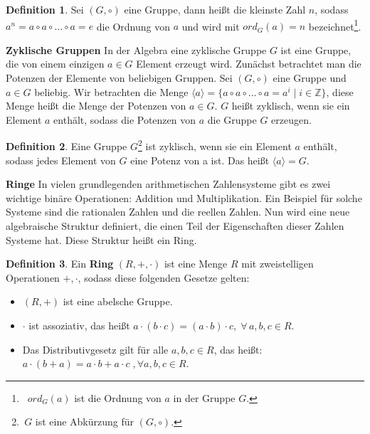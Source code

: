 \documentclass[12pt,oneside]{article}
\theoremstyle{remark}
\theoremstyle{definition}
\newtheorem{definition}{Definition}[section]
\begin{document}
\begin{definition}
Sei $(G,\circ)$ eine Gruppe, dann heißt die kleinste Zahl $n$, sodass $a^n = a \circ a \circ \dots \circ a = e$ die Ordnung von $a$ und wird mit $ord_{G}(a) = n $ bezeichnet\footnote{$\,$ $ord_{G}(a)$ ist die Ordnung von $a$ in der Gruppe $G$.}.
\end{definition}



\smallskip

\textbf{Zyklische Gruppen}\newline
In der Algebra eine zyklische Gruppe $G$ ist eine Gruppe, die von einem einzigen $a \in G$ Element erzeugt wird. Zunächst betrachtet man die Potenzen der Elemente von beliebigen Gruppen. Sei $(G,\circ)$ eine Gruppe und $a \in G$ beliebig. Wir betrachten die Menge $\langle a \rangle = \{ a \circ a \circ \dots \circ a =  a^i \mid i \in \mathbb{Z}\}$, diese Menge heißt die Menge der Potenzen von $a \in G$. $G$ heißt zyklisch, wenn sie ein Element $a$ enthält, sodass die Potenzen von $a$ die Gruppe $G$ erzeugen. 

\begin{definition}
Eine Gruppe $G$\footnote{$\, G $ ist eine Abkürzung für $(G,\circ)$.} ist zyklisch, wenn sie ein Element $a$ enthält, sodass jedes Element von $G$ eine Potenz von a ist. Das heißt $\langle a \rangle = G$.
\end{definition}

\smallskip

\textbf{Ringe}\newline
In vielen grundlegenden arithmetischen Zahlensysteme gibt es zwei wichtige binäre Operationen: Addition und Multiplikation. Ein Beispiel für solche Systeme sind die rationalen Zahlen und die reellen Zahlen. Nun wird eine neue algebraische Struktur definiert, die einen Teil der Eigenschaften dieser Zahlen Systeme hat. Diese Struktur heißt ein Ring.       

\begin{definition}
Ein \textbf{Ring} $(R,+,\cdot)$ ist eine Menge $R$ mit zweistelligen Operationen $+, \cdot$, sodass diese folgenden Gesetze gelten:
\begin{itemize}
    \item $(R,+)$ ist eine abelsche Gruppe.
    \item $\cdot$ ist assoziativ, das heißt $a \cdot (b \cdot c) = (a \cdot b) \cdot c, \; \forall \, a,b,c \in R $. 
    \item Das Distributivgesetz gilt für alle $a,b,c \in R$, das heißt: $a \cdot (b + a) = a \cdot b + a \cdot c \; ,\forall a,b,c \in R$.
\end{itemize}
\end{definition}
\end{document}

